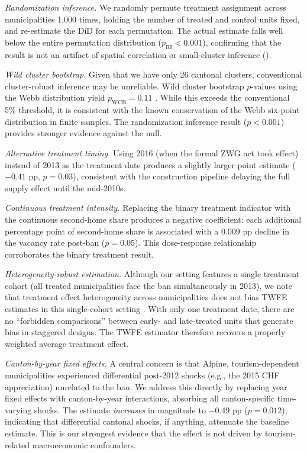 \documentclass[12pt]{article}
\begin{document}
\textit{Randomization inference.} We randomly permute treatment assignment across municipalities 1,000 times, holding the number of treated and control units fixed, and re-estimate the DiD for each permutation. The actual estimate falls well below the entire permutation distribution ($p_{\text{RI}} < 0.001$), confirming that the result is not an artifact of spatial correlation or small-cluster inference ().

\textit{Wild cluster bootstrap.} Given that we have only 26 cantonal clusters, conventional cluster-robust inference may be unreliable. Wild cluster bootstrap $p$-values using the Webb distribution yield $p_{\text{WCB}} = 0.11$ \citep{cameron2008bootstrap}. While this exceeds the conventional 5\% threshold, it is consistent with the known conservatism of the Webb six-point distribution in finite samples. The randomization inference result ($p < 0.001$) provides stronger evidence against the null.

\textit{Alternative treatment timing.} Using 2016 (when the formal ZWG act took effect) instead of 2013 as the treatment date produces a slightly larger point estimate ($-0.41$ pp, $p = 0.03$), consistent with the construction pipeline delaying the full supply effect until the mid-2010s.

\textit{Continuous treatment intensity.} Replacing the binary treatment indicator with the continuous second-home share produces a negative coefficient: each additional percentage point of second-home share is associated with a 0.009 pp decline in the vacancy rate post-ban ($p = 0.05$). This dose-response relationship corroborates the binary treatment result.

\textit{Heterogeneity-robust estimation.} Although our setting features a single treatment cohort (all treated municipalities face the ban simultaneously in 2013), we note that treatment effect heterogeneity across municipalities does not bias TWFE estimates in this single-cohort setting \citep{callaway2021difference}. With only one treatment date, there are no ``forbidden comparisons'' between early- and late-treated units that generate bias in staggered designs. The TWFE estimator therefore recovers a properly weighted average treatment effect.

\textit{Canton-by-year fixed effects.} A central concern is that Alpine, tourism-dependent municipalities experienced differential post-2012 shocks (e.g., the 2015 CHF appreciation) unrelated to the ban. We address this directly by replacing year fixed effects with canton-by-year interactions, absorbing all canton-specific time-varying shocks. The estimate \textit{increases} in magnitude to $-0.49$ pp ($p = 0.012$), indicating that differential cantonal shocks, if anything, attenuate the baseline estimate. This is our strongest evidence that the effect is not driven by tourism-related macroeconomic confounders.
\end{document}
